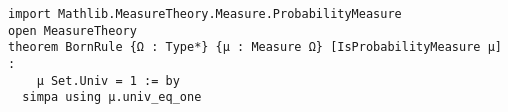 \begin{lstlisting}[language=Lean]
import Mathlib.MeasureTheory.Measure.ProbabilityMeasure
open MeasureTheory
theorem BornRule {Ω : Type*} {μ : Measure Ω} [IsProbabilityMeasure μ] :
    μ Set.Univ = 1 := by
  simpa using μ.univ_eq_one 
\end{lstlisting}
